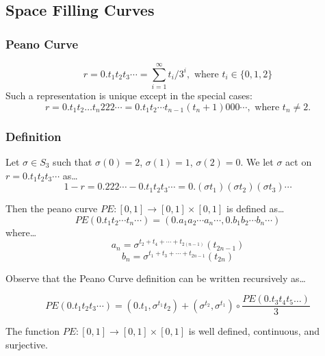 \subsection{Space Filling Curves}\label{spacefillingcurves}

\subsubsection{Peano Curve}\label{peanocurve}

\label{ternaryexpansion}
$$r = 0.t_1t_2t_3\cdots = \sum^{\infty}_{i=1}t_i/3^i, \textrm{ where } t_i \in \{ 0, 1, 2 \}$$
Such a representation is unique except in the special cases:
$$r = 0.t_1t_2\dots t_n222\cdots = 0.t_1t_2\cdots t_{n-1}(t_n + 1)000\cdots, \textrm{ where } t_n \neq 2.$$

\subsubsection{Definition}
Let $\sigma \in S_3$ such that $\sigma(0) = 2$, $\sigma(1) = 1$, $\sigma(2) = 0$. We let $\sigma$ act on $r = 0.t_1t_2t_3\cdots$ as\dots
$$1 - r = 0.222\cdots - 0.t_1t_2t_3\cdots = 0.(\sigma t_1)(\sigma t_2)(\sigma t_3)\cdots$$

\noindent Then the peano curve $PE : [0,1] \rightarrow [0,1] \times [0,1]$ is defined as\dots
$$PE(0.t_1t_2\cdots t_n\cdots) = (0.a_1a_2\cdots a_n\cdots, 0.b_1b_2\cdots b_n\cdots)$$
where\dots
$$a_n = \sigma^{t_2 + t_4 + \cdots + t_{2(n-1)}} (t_{2n-1})$$
$$b_n = \sigma^{t_1 + t_3 + \cdots + t_{2n-1}} (t_{2n})$$

\noindent Observe that the Peano Curve definition can be written recursively as\dots

$$PE(0.t_1t_2t_3\cdots) = (0.t_1,\sigma^{t_1}t_2) + (\sigma^{t_2},\sigma^{t_1}) \circ \frac{PE(0.t_3t_4t_5\dots)}{3}$$

\begin{theorem}
The function $PE : [0,1] \rightarrow [0,1] \times [0,1]$ is well defined, continuous, and surjective.
\end{theorem}

